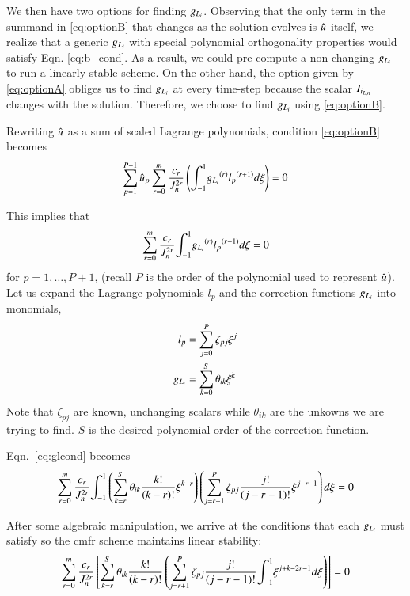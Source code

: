 We then have two options for finding $\gL$. Observing that the only term in the summand in \eqref{eq:optionB} that changes as the solution evolves is $\urd$ itself, we realize that a generic $\gL$ with special polynomial orthogonality properties would satisfy Eqn. \eqref{eq:b_cond}. As a result, we could pre-compute a non-changing $\gL$ to run a linearly stable scheme. On the other hand, the option given by \eqref{eq:optionA} obliges us to find
$\gL$ at every time-step because the scalar $\IL[i]$ changes with the solution. Therefore, we choose to find
$\gL$ using \eqref{eq:optionB}. %


Rewriting $\urd$ as a sum of scaled Lagrange polynomials, condition \eqref{eq:optionB} becomes
\begin{equation}
 \label{eq:glcond1}  \sum^{P+1}_{p=1} \urd_p \sum^m_{r=0} \frac{c_r}{J^{2r}_n} \l(\ioo \dD{\gL}{r}
\dD{l_p}{r+1} d\xi \r) = 0
\end{equation}

This implies that
\begin{equation}\label{eq:glcond}
\sum^m_{r=0}\frac{c_r}{J^{2r}_n} \ioo \dD{\gL}{r} \dD{l_p}{r+1} d\xi = 0 
\end{equation}
for $p=1,\ldots, P+1$, (recall $P$ is the order of the polynomial used to represent $\urd$).
Let us expand the Lagrange polynomials $l_p$ and the correction functions $\gL$ into monomials,
\begin{equation}
\begin{split}
 l_p&=\sum^P_{j=0} \zeta_{pj} \xi^j\\
 \gL &= \sum^S_{k=0} \theta_{ik} \xi^k 
 \end{split}
\end{equation}
Note that $\zeta_{pj}$ are known, unchanging scalars while $\theta_{ik}$ are the unkowns we are trying to find. $S$ is the desired polynomial order of the correction function.

Eqn.~\eqref{eq:glcond} becomes
 \begin{equation*}
\sum^m_{r=0} \frac{c_r}{J^{2r}_n} \ioo 
\l( \sum^S_{k=r} \theta_{ik} \frac{k!}{(k-r)!} 
\xi^{k-r}  \r)
\l(
\sum^P_{j=r+1}\zeta_{pj}\frac{j!}{(j-r-1)!}  \xi^{j-r-1} \r)
d\xi =0
\end{equation*}

After some algebraic manipulation, we arrive at the conditions that each $\gL$ must satisfy so the \gls{cmfr} scheme maintains linear stability:
\begin{equation}
 \label{eq:gcond}
\sum^m_{r=0} \frac{c_r}{J^{2r}_n}  
\l[ \sum^S_{k=r} \theta_{ik} \frac{k!}{(k-r)!} 
\l(
\sum^P_{j=r+1}\zeta_{pj}\frac{j!}{(j-r-1)!}  \ioo \xi^{j+k-2r-1} d\xi\r)\r]
 =0
\end{equation}

